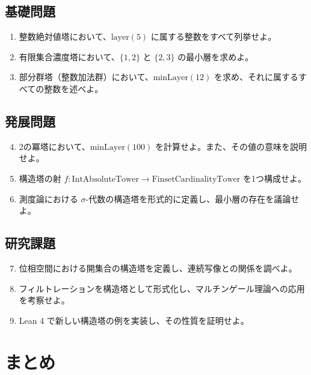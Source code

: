 \documentclass[a4paper,11pt]{ltjsarticle}
\begin{document}
\subsection{基礎問題}

\begin{enumerate}
\item 整数絶対値塔において、$\text{layer}(5)$ に属する整数をすべて列挙せよ。

\item 有限集合濃度塔において、$\{1, 2\}$ と $\{2, 3\}$ の最小層を求めよ。

\item 部分群塔（整数加法群）において、$\text{minLayer}(12)$ を求め、それに属するすべての整数を述べよ。
\end{enumerate}

\subsection{発展問題}

\begin{enumerate}
\setcounter{enumi}{3}
\item 2の冪塔において、$\text{minLayer}(100)$ を計算せよ。また、その値の意味を説明せよ。

\item 構造塔の射 $f : \text{IntAbsoluteTower} \to \text{FinsetCardinalityTower}$ を1つ構成せよ。

\item 測度論における $\sigma$-代数の構造塔を形式的に定義し、最小層の存在を議論せよ。
\end{enumerate}

\subsection{研究課題}

\begin{enumerate}
\setcounter{enumi}{6}
\item 位相空間における開集合の構造塔を定義し、連続写像との関係を調べよ。

\item フィルトレーションを構造塔として形式化し、マルチンゲール理論への応用を考察せよ。

\item Lean 4 で新しい構造塔の例を実装し、その性質を証明せよ。
\end{enumerate}

\newpage

\section{まとめ}
\end{document}
